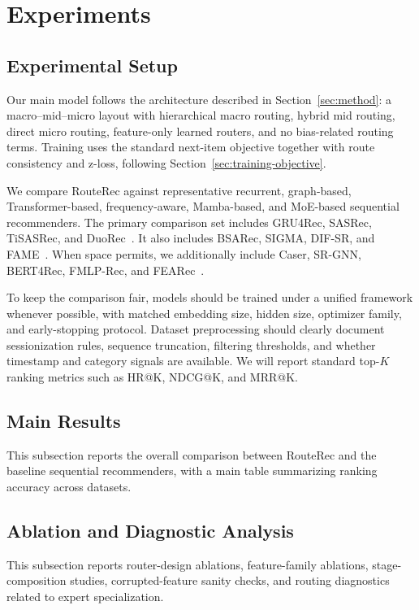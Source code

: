 \documentclass[sigconf,anonymous,review]{acmart}
\begin{document}
\section{Experiments}
\label{sec:experiments}

\subsection{Experimental Setup}
Our main model follows the architecture described in Section~\ref{sec:method}: a macro--mid--micro layout with hierarchical macro routing, hybrid mid routing, direct micro routing, feature-only learned routers, and no bias-related routing terms. Training uses the standard next-item objective together with route consistency and z-loss, following Section~\ref{sec:training-objective}.

We compare RouteRec against representative recurrent, graph-based, Transformer-based, frequency-aware, Mamba-based, and MoE-based sequential recommenders. The primary comparison set includes GRU4Rec, SASRec, TiSASRec, and DuoRec~\cite{hidasi2016gru4rec,kang2018sasrec,li2020tisasrec,qiu2022duorec}. It also includes BSARec, SIGMA, DIF-SR, and FAME~\cite{shin2024bsarec,liu2025sigma,xie2022difsr,liu2025fame}. When space permits, we additionally include Caser, SR-GNN, BERT4Rec, FMLP-Rec, and FEARec~\cite{tang2018caser,wu2019srgnn,sun2019bert4rec,zhou2022fmlprec,du2023fearec}.

To keep the comparison fair, models should be trained under a unified framework whenever possible, with matched embedding size, hidden size, optimizer family, and early-stopping protocol. Dataset preprocessing should clearly document sessionization rules, sequence truncation, filtering thresholds, and whether timestamp and category signals are available. We will report standard top-$K$ ranking metrics such as HR@K, NDCG@K, and MRR@K.

\subsection{Main Results}
This subsection reports the overall comparison between RouteRec and the baseline sequential recommenders, with a main table summarizing ranking accuracy across datasets.

\subsection{Ablation and Diagnostic Analysis}
This subsection reports router-design ablations, feature-family ablations, stage-composition studies, corrupted-feature sanity checks, and routing diagnostics related to expert specialization.
\end{document}
